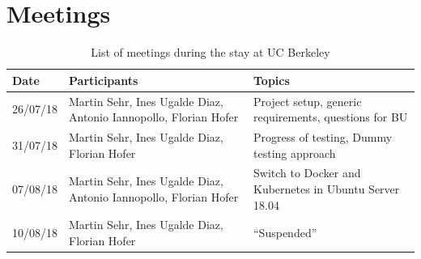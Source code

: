 \documentclass[]{scrartcl}
\begin{document}
\section{Meetings}
\label{sec:meeting}

\begin{table}[H]
	\centering
	\caption{List of meetings during the stay at UC Berkeley}
	
	\begin{tabular}{l p{5cm} p{5cm}}
	Date & Participants & Topics \\
	\hline
	26/07/18 & Martin Sehr, Ines Ugalde Diaz, Antonio Iannopollo, Florian Hofer & Project setup, generic requirements, questions for BU\\
	31/07/18 & Martin Sehr, Ines Ugalde Diaz, Florian Hofer & Progress of testing, Dummy testing approach\\
	07/08/18 & Martin Sehr, Ines Ugalde Diaz, Antonio Iannopollo, Florian Hofer & Switch to Docker and Kubernetes in Ubuntu Server 18.04\\
	10/08/18 & Martin Sehr, Ines Ugalde Diaz, Florian Hofer & ``Suspended''\\
	\hline
	\end{tabular}
	
	\label{tab:meeting}
\end{table}



\end{document}
